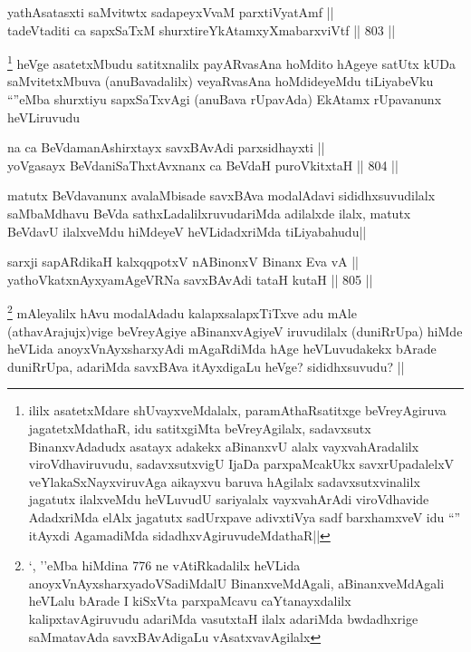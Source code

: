\begin{shl}
yathA\s satasxti saMvitwtx sadapeyxVvaM parxtiVyatAmf || \\
tadeVtaditi ca sapxSaTxM shurxtireYkAtamxyXmabarxviVtf ||  803 ||  
\end{shl}

\begin{artha}
\footnote{ililx asatetxMdare shUvayxveMdalalx, paramAthaRsatitxge beVreyAgiruva jagatetxMdathaR, idu satitxgiMta beVreyAgilalx, sadavxsutx BinanxvAdadudx asatayx adakekx aBinanxvU alalx vayxvahAradalilx viroVdhaviruvudu, sadavxsutxvigU IjaDa parxpaMcakUkx savxrUpadalelxV veYlakaSxNayxviruvAga aikayxvu baruva hAgilalx sadavxsutxvinalilx jagatutx ilalxveMdu heVLuvudU sariyalalx vayxvahArAdi viroVdhavide AdadxriMda elAlx jagatutx sadUrxpave adivxtiVya sadf barxhamxveV idu ``\stext'' itAyxdi AgamadiMda sidadhxvAgiruvudeMdathaR||}
heVge asatetxMbudu satitxnalilx payARvasAna hoMdito hAgeye satUtx kUDa saMvitetxMbuva (anuBavadalilx) veyaRvasAna hoMdideyeMdu tiLiyabeVku ``\stext''eMba shurxtiyu sapxSaTxvAgi (anuBava rUpavAda) EkAtamx rUpavanunx heVLiruvudu
\end{artha}

\begin{shl}
na ca BeVdamanAshirxtayx savxBAvAdi parxsidhayxti ||  \\
yoVgasayx BeVdaniSaThxtAvxnanx ca BeVdaH puroVkitxtaH ||  804 ||  
\end{shl}

\begin{artha}
matutx BeVdavanunx avalaMbisade savxBAva modalAdavi sididhxsuvudilalx saMbaMdhavu BeVda sathxLadalilxruvudariMda adilalxde ilalx, matutx BeVdavU ilalxveMdu hiMdeyeV heVLidadxriMda tiLiyabahudu||
\end{artha}


\begin{shl}
sarxji sapARdikaH kalxqqpotxV nABinonxV Binanx Eva vA || \\
yathoVkatxnAyxyamAgeVRNa savxBAvAdi tataH kutaH ||  805 ||  
\end{shl}

\begin{artha}
\footnote{`\stext, \stext''eMba hiMdina 776 ne vAtiRkadalilx heVLida anoyxVnAyxsharxyadoVSadiMdalU BinanxveMdAgali, aBinanxveMdAgali heVLalu bArade I kiSxVta parxpaMcavu caYtanayxdalilx kalipxtavAgiruvudu adariMda vasutxtaH ilalx adariMda bwdadhxrige saMmatavAda savxBAvAdigaLu vAsatxvavAgilalx}
mAleyalilx hAvu modalAdadu kalapxsalapxTiTxve adu mAle (athavArajujx)vige beVreyAgiye aBinanxvAgiyeV iruvudilalx (duniRrUpa) hiMde heVLida anoyxVnAyxsharxyAdi mAgaRdiMda hAge heVLuvudakekx bArade duniRrUpa, adariMda savxBAva itAyxdigaLu heVge? sididhxsuvudu? ||
\end{artha}

